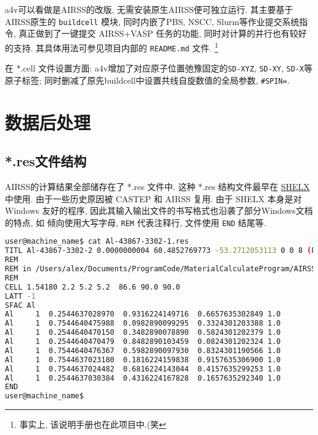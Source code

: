 \documentclass[a4paper, 10pt]{article}
\begin{document}
a4v可以看做是AIRSS的改版, 无需安装原生AIRSS便可独立运行. 其主要基于AIRSS原生的 \verb|buildcell| 模块, 同时内嵌了PBS, NSCC, Slurm等作业提交系统指令, 真正做到了一键提交 AIRSS+VASP 任务的功能, 同时对计算的并行也有较好的支持. 其具体用法可参见项目内部的 \verb|README.md| 文件. \footnote{事实上, 该说明手册也在此项目中.(笑} 

在 *.cell 文件设置方面: a4v增加了对应原子位置弛豫固定的\verb|SD-XYZ|, \verb|SD-XY|, \verb|SD-X|等原子标签; 同时删减了原先buildcell中设置共线自旋数值的全局参数, \verb|#SPIN=|.

\newpage
\section{数据后处理}
\subsection{*.res文件结构}
AIRSS的计算结果全部储存在了 *.res 文件中. 这种 *.res 结构文件最早在 \href{https://strucbio.biologie.uni-konstanz.de/ccp4wiki/index.php/SHELXL}{SHELX} 中使用. 由于一些历史原因被 CASTEP 和 AIRSS 复用. 由于 SHELX 本身是对 Windows 友好的程序, 因此其输入输出文件的书写格式也沿袭了部分Windows文档的特点, 如 倾向使用大写字母, \verb|REM| 代表注释行, 文件使用 \verb|END| 结尾等.

\begin{lstlisting}[language={bash}]
user@machine_name$ cat Al-43867-3302-1.res
TITL Al-43867-3302-2 0.0000000004 60.4852769773 -53.2712053113 0 0 8 (P63/mmc) n - 1
REM
REM in /Users/alex/Documents/ProgramCode/MaterialCalculateProgram/AIRSS/airss-0.9/examples/1.1
REM
CELL 1.54180 2.2 5.2 5.2  86.6 90.0 90.0
LATT -1
SFAC Al 
Al     1  0.2544637028970  0.9316224149716  0.6657635302849 1.0
Al     1  0.7544640475988  0.0982890099295  0.3324301203388 1.0
Al     1  0.2544640470150  0.3482890078890  0.5824301202379 1.0
Al     1  0.2544640470479  0.8482890103459  0.0824301202324 1.0
Al     1  0.7544640476367  0.5982890097930  0.8324301190566 1.0
Al     1  0.7544637023180  0.1816224159838  0.9157635306900 1.0
Al     1  0.7544637024482  0.6816224143044  0.4157635299253 1.0
Al     1  0.2544637030384  0.4316224167828  0.1657635292340 1.0
END
user@machine_name$
\end{lstlisting}
\end{document}
